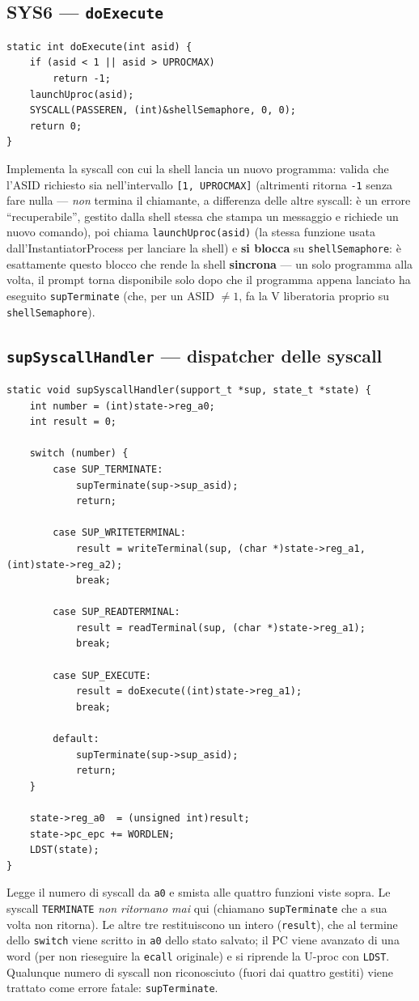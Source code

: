 \documentclass[11pt,a4paper]{article}
\newcommand{\code}[1]{\texttt{#1}}
\newcommand{\func}[1]{\textbf{\texttt{#1}}}
\begin{document}
\subsection{SYS6 --- \func{doExecute}}
\begin{lstlisting}
static int doExecute(int asid) {
    if (asid < 1 || asid > UPROCMAX)
        return -1;
    launchUproc(asid);
    SYSCALL(PASSEREN, (int)&shellSemaphore, 0, 0);
    return 0;
}
\end{lstlisting}
Implementa la syscall con cui la shell lancia un nuovo programma: valida che
l'ASID richiesto sia nell'intervallo \code{[1, UPROCMAX]} (altrimenti
ritorna \code{-1} senza fare nulla --- \emph{non} termina il chiamante, a
differenza delle altre syscall: è un errore ``recuperabile'', gestito dalla
shell stessa che stampa un messaggio e richiede un nuovo comando), poi
chiama \code{launchUproc(asid)} (la stessa funzione usata
dall'InstantiatorProcess per lanciare la shell) e \textbf{si blocca} su
\code{shellSemaphore}: è esattamente questo blocco che rende la shell
\textbf{sincrona} --- un solo programma alla volta, il prompt torna
disponibile solo dopo che il programma appena lanciato ha eseguito
\code{supTerminate} (che, per un ASID $\ne 1$, fa la V liberatoria proprio
su \code{shellSemaphore}).

\subsection{\func{supSyscallHandler} --- dispatcher delle syscall}
\begin{lstlisting}
static void supSyscallHandler(support_t *sup, state_t *state) {
    int number = (int)state->reg_a0;
    int result = 0;

    switch (number) {
        case SUP_TERMINATE:
            supTerminate(sup->sup_asid);
            return;

        case SUP_WRITETERMINAL:
            result = writeTerminal(sup, (char *)state->reg_a1, (int)state->reg_a2);
            break;

        case SUP_READTERMINAL:
            result = readTerminal(sup, (char *)state->reg_a1);
            break;

        case SUP_EXECUTE:
            result = doExecute((int)state->reg_a1);
            break;

        default:
            supTerminate(sup->sup_asid);
            return;
    }

    state->reg_a0  = (unsigned int)result;
    state->pc_epc += WORDLEN;
    LDST(state);
}
\end{lstlisting}
Legge il numero di syscall da \code{a0} e smista alle quattro funzioni viste
sopra. Le syscall \code{TERMINATE} \emph{non ritornano mai} qui (chiamano
\code{supTerminate} che a sua volta non ritorna). Le altre tre restituiscono
un intero (\code{result}), che al termine dello \code{switch} viene scritto
in \code{a0} dello stato salvato; il PC viene avanzato di una word (per non
rieseguire la \code{ecall} originale) e si riprende la U-proc con
\code{LDST}. Qualunque numero di syscall non riconosciuto (fuori dai quattro
gestiti) viene trattato come errore fatale: \code{supTerminate}.
\end{document}
